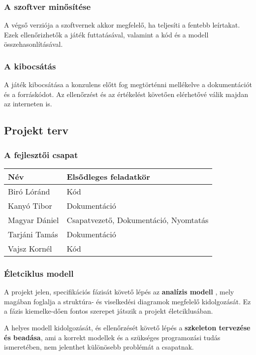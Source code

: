 \subsubsection{A szoftver minősítése}

A végső verziója a szoftvernek akkor megfelelő, ha teljesíti a fentebb leírtakat. Ezek ellenőrizhetők a játék futtatásával, valamint a kód és a modell összehasonlításával.

\subsubsection{A kibocsátás}

A játék kibocsátása a konzulens előtt fog megtörténni mellékelve a dokumentációt és a forráskódot. Az ellenőrzést és az értékelést követően elérhetővé válik majdan az interneten is.

\subsection{Projekt terv}

\subsubsection{A fejlesztői csapat}
\begin{tabular}{|l|l|}
\hline 
\textbf{Név} & \textbf{Elsődleges feladatkör} \\ 
\hline 
Biró Lóránd & Kód \\ 
\hline 
Kanyó Tibor & Dokumentáció \\ 
\hline 
Magyar Dániel & Csapatvezető, Dokumentáció, Nyomtatás \\ 
\hline 
Tarjáni Tamás & Dokumentáció \\ 
\hline 
Vajsz Kornél & Kód \\ 
\hline 
\end{tabular} 

\subsubsection{Életciklus modell}
	A projekt jelen, specifikációs fázisát követő lépés az \textbf{analízis modell }, mely magában foglalja a struktúra- és viselkedési diagramok megfelelő kidolgozását. Ez a fázis kiemelke-dően fontos szerepet játszik a projekt életciklusában. 

	A helyes modell kidolgozását, és ellenőrzését követő lépés a \textbf{szkeleton tervezése és beadása}, ami a korrekt modellek és a szükséges programozási tudás ismeretében, nem jelenthet különösebb problémát a csapatnak.
	
